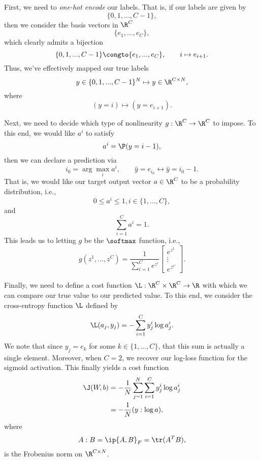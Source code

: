 First, we need to \textit{one-hot encode} our labels.  That is, if our labels are given by
$$\{0,1,...,C-1\},$$
then we consider the basis vectors in $\R^C$
$$\{e_1,...,e_C\},$$
which clearly admits a bijection
$$\{0,1,...,C-1\}\congto\{e_1,...,e_C\},\qquad i\mapsto e_{i+1}.$$
Thus, we've effectively mapped our true labels
$$y\in\{0,1,...,C-1\}^N\mapsto y\in\R^{C\times N},$$
where
$$(y=i)\mapsto (y=e_{i+1}).$$

Next, we need to decide which type of nonlinearity $g:\R^C\to\R^C$ to impose.  To this end, we would like $a^i$ to satisfy
$$a^i=\P(y=i-1),$$
then we can declare a prediction via
$$i_0=\arg\max_ia^i,\qquad \hat{y}=e_{i_0}\leftrightarrow\hat{y}=i_0-1.$$
That is, we would like our target output vector $a\in\R^C$ to be a probability distribution, i.e.,
$$0\leq a^i\leq 1,i\in\{1,...,C\},$$
and
$$\sum_{i=1}^Ca^i=1.$$
This leads us to letting $g$ be the $\softmax$ function, i.e.,
$$g(z^1,...,z^C)=\frac{1}{\sum_{i=1}^Ce^{z^i}}\begin{bmatrix}
	e^{z^1}\\
	\vdots\\
	e^{z^C}
\end{bmatrix}.$$

Finally, we need to define a cost function $\L:\R^C\times\R^C\to\R$ with which we can compare our true value to our predicted value.  To this end, we consider the cross-entropy function $\L$ defined by
$$\L(a_j,y_j)=-\sum_{i=1}^Cy^i_j\log{a^i_j}.$$
We note that since $y_j=e_k$ for some $k\in\{1,...,C\}$, that this sum is actually a single element.  Moreover, when $C=2$, we recover our log-loss function for the sigmoid activation.  This finally yields a cost function
\begin{align*}
	\J(W,b)&=-\frac{1}{N}\sum_{j=1}^N\sum_{i=1}^Cy^i_j\log{a^i_j}\\
	&=-\frac{1}{N}(y:\log{a}),
\end{align*}
where
$$A:B=\ip{A,B}_F=\tr(A^TB),$$
is the Frobenius norm on $\R^{C\times N}$.

